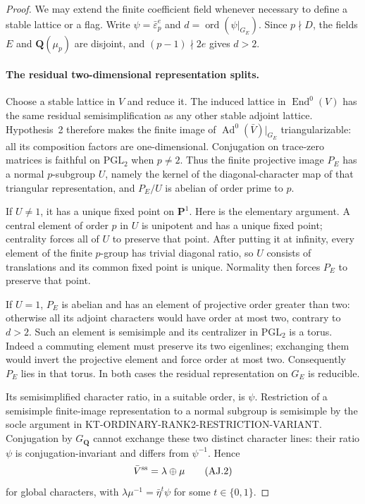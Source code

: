 \begin{proof}
We may extend the finite coefficient field whenever
necessary to define a stable lattice or a flag.
Write $\psi=\bar\varepsilon_p^e$ and
$d=\operatorname{ord}(\psi|_{G_E})$.  Since
$p\nmid D$, the fields $E$ and $\mathbf Q(\mu_p)$
are disjoint, and $(p-1)\nmid2e$ gives $d>2$.

\paragraph{The residual two-dimensional representation splits.}
Choose a stable lattice in $V$ and reduce it.
The induced lattice in $\operatorname{End}^0(V)$
has the same residual semisimplification as any
other stable adjoint lattice.  Hypothesis~2
therefore makes the finite image of
$\operatorname{Ad}^0(\bar V)|_{G_E}$ triangularizable:
all its composition factors are one-dimensional.
Conjugation on trace-zero matrices is faithful
on $\mathrm{PGL}_2$ when $p\ne2$.
Thus the finite projective image $P_E$ has a
normal $p$-subgroup $U$, namely the kernel of
the diagonal-character map of that triangular
representation, and $P_E/U$ is abelian of
order prime to $p$.

If $U\ne1$, it has a unique fixed point on
$\mathbf P^1$.  Here is the elementary argument.
A central element of order $p$ in $U$ is
unipotent and has a unique fixed point; centrality
forces all of $U$ to preserve that point.
After putting it at infinity, every element of
the finite $p$-group has trivial diagonal ratio,
so $U$ consists of translations and its common
fixed point is unique.  Normality then forces
$P_E$ to preserve that point.

If $U=1$, $P_E$ is abelian and has an element
of projective order greater than two: otherwise
all its adjoint characters would have order at
most two, contrary to $d>2$.
Such an element is semisimple and its centralizer
in $\mathrm{PGL}_2$ is a torus.  Indeed a commuting
element must preserve its two eigenlines;
exchanging them would invert the projective
element and force order at most two.
Consequently $P_E$ lies in that torus.
In both cases the residual representation on
$G_E$ is reducible.

Its semisimplified character ratio, in a suitable
order, is $\psi$.  Restriction of a semisimple
finite-image representation to a normal subgroup
is semisimple by the socle argument in
KT-ORDINARY-RANK2-RESTRICTION-VARIANT.
Conjugation by $G_{\mathbf Q}$ cannot exchange
these two distinct character lines: their ratio
$\psi$ is conjugation-invariant and differs from
$\psi^{-1}$.  Hence
\[
                  \bar V^{\rm ss}=\lambda\oplus\mu
                                                               \tag{AJ.2}
\]
for global characters, with
$\lambda\mu^{-1}=\bar\eta^t\psi$ for some
$t\in\{0,1\}$.


\end{proof}
